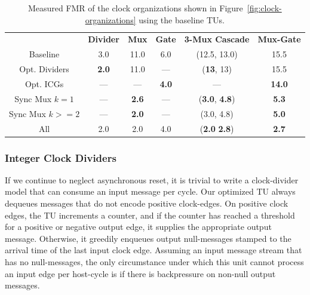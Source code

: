 \begin{table}[t]
\centering
    \begin{tabular}{c c c c c c}
    \hline
           & \textbf{Divider} & \textbf{Mux} & \textbf{Gate} & \textbf{3-Mux Cascade} & \textbf{Mux-Gate} \\
          Baseline        & 3.0 & 11.0  & 6.0 & (12.5, 13.0) & 15.5 \\
          Opt. Dividers   & \textbf{2.0} & 11.0          & ---        & (\textbf{13}, 13)             & 15.5 \\
          Opt. ICGs       & ---          & ---           & \textbf{4.0} &  ---                          & \textbf{14.0} \\
          Sync Mux $k=1$  & ---          & \textbf{2.6}  & ---        & (\textbf{3.0}, \textbf{4.8}) & \textbf{5.3} \\
          Sync Mux $k>=2$ & ---          & \textbf{2.0}  & ---       & (3.0, 4.8)                   & \textbf{5.0} \\
    \hline
          All & 2.0 & 2.0 & 4.0 & (\textbf{2.0} \textbf{2.8}) & \textbf{2.7} \\
    \end{tabular}
    \caption{Measured FMR of the clock organizations shown in Figure~\ref{fig:clock-organizations} using the baseline TUs.}
    \label{tbl:pdes-baseline-fmrs}
\end{table}

\subsubsection{Integer Clock Dividers}
If we continue to neglect asynchronous reset, it is trivial to write a
clock-divider model that can consume an input message per cycle. Our optimized
TU always dequeues messages that do not encode positive clock-edges. On
positive clock edges, the TU increments a counter, and if the counter has
reached a threshold for a positive or negative output edge, it supplies the
appropriate output message.  Otherwise, it greedily enqueues output
null-messages stamped to the arrival time of the last input clock edge.
Assuming an input message stream that has no null-messages, the only
circumstance under which this unit cannot process an input edge per host-cycle
is if there is backpressure on non-null output messages.

